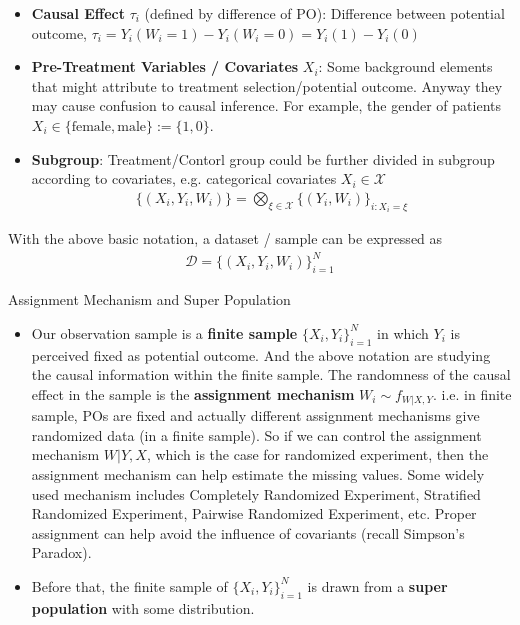 \begin{itemize}[topsep=2pt,itemsep=0pt]
        
        \item \textbf{Causal Effect} $ \tau_i $ (defined by difference of PO): Difference between potential outcome, $ \tau_i=Y_i(W_i=1)-Y_i(W_i=0)=Y_i(1)-Y_i(0) $
        \item \textbf{Pre-Treatment Variables / Covariates} $ X_i $: Some background elements that might attribute to treatment selection/potential outcome. Anyway they may cause confusion to causal inference. For example, the gender of patients $ X_i\in\{\mathrm{female}, \mathrm{male}  \}:=\{1,0\} $.
        \item \textbf{Subgroup}: Treatment/Contorl group could be further divided in subgroup according to covariates, e.g. categorical covariates $ X_i\in\mathcal{X} $
        \begin{align}
            \{(X_i,Y_i,W_i)\}=\bigotimes_{\xi \in\mathcal{\mathcal{X}}}\{(Y_i,W_i)\}_{i:X_i=\xi }
        \end{align}
    \end{itemize}

    With the above basic notation, a dataset / sample can be expressed as
    \begin{align}
        \mathcal{D}=\{(X_i,Y_i,W_i)\}_{i=1}^N 
    \end{align}
    

\begin{point}
    Assignment Mechanism and Super Population
\end{point}

\begin{itemize}[topsep=2pt,itemsep=0pt]
    \item Our observation sample is a \textbf{finite sample} $\{X_i,Y_i\}_{i=1}^N $ in which $ Y_i $ is perceived fixed as potential outcome. And the above notation are studying the causal information within the finite sample. The randomness of the causal effect in the sample is the \textbf{assignment mechanism} $ W_i\sim f_{W|X,Y} $. i.e. in finite sample, POs are fixed and actually different assignment mechanisms give randomized data (in a finite sample). So if we can control the assignment mechanism $ W|Y,X $, which is the case for randomized experiment, then the assignment mechanism can help estimate the missing values.   
    Some widely used mechanism includes Completely Randomized Experiment, Stratified Randomized Experiment, Pairwise Randomized Experiment, etc. Proper assignment can help avoid the influence of covariants (recall Simpson's Paradox).
    \item Before that, the finite sample of $ \{X_i,Y_i\}_{i=1}^N $ is drawn from a \textbf{super population} with some distribution.
\end{itemize}


